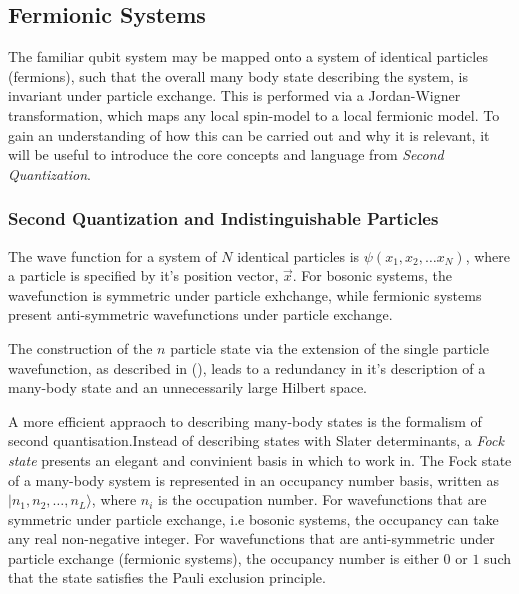 
\subsection{Fermionic Systems}

The familiar qubit system may be mapped onto a system of identical particles (fermions), such that the 
overall many body state describing the system, is invariant under particle exchange. This is 
performed via a Jordan-Wigner transformation, which maps any local spin-model to a local fermionic model.
To gain an understanding of how this can be carried out and why it is relevant, it will be useful to introduce the core concepts and language from \textit{Second Quantization}.

\subsubsection{Second Quantization and Indistinguishable Particles}


The wave function for a system of $N$ identical particles is $\psi(x_1, x_2, \dots x_N)$, where a particle is specified by it's position vector, $\vec{x}$. For bosonic systems, the wavefunction is symmetric under particle exhchange, while fermionic systems present anti-symmetric wavefunctions under particle exchange. 


The construction of the $n$ particle state via the extension of the single particle wavefunction, as described in (), 
leads to a redundancy in it's description of a many-body state and an unnecessarily large Hilbert space. 



A more efficient appraoch to describing many-body states is the formalism of second quantisation.Instead of describing states with Slater determinants, a \textit{Fock state} presents an elegant and convinient basis in which to work in. The Fock state of a many-body system is represented in an occupancy number basis, written as $|n_1, n_2, \dots, n_L\rangle$, where $n_i$ is the occupation number. For wavefunctions that are symmetric under particle exchange, i.e bosonic systems, the occupancy can take any real non-negative integer. For wavefunctions that are anti-symmetric under particle exchange (fermionic systems), the occupancy number is either $0$ or $1$ such that the state satisfies the Pauli exclusion principle.

